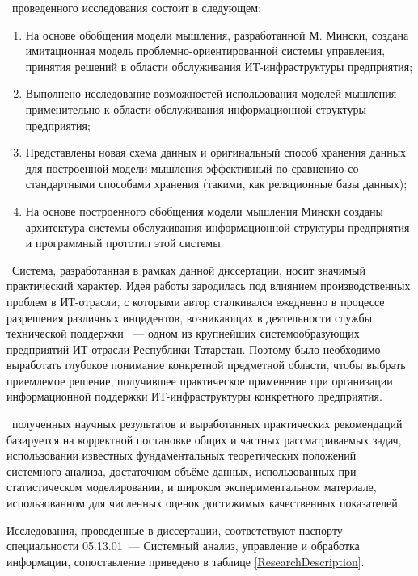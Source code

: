 \novelty\ проведенного исследования состоит в следующем:
\begin{enumerate}
  \item На основе обобщения модели мышления, разработанной М. Мински, создана имитационная модель проблемно-ориентированной системы управления, принятия решений в области обслуживания ИТ-инфраструктуры предприятия;
  \item Выполнено исследование возможностей использования моделей мышления применительно к области обслуживания информационной структуры предприятия;
  \item Представлены новая схема данных и оригинальный способ хранения данных для построенной модели мышления эффективный по сравнению со стандартными способами хранения (такими, как реляционные базы данных);
  \item На основе построенного обобщения модели мышления Мински созданы архитектура системы обслуживания информационной структуры предприятия и программный прототип этой системы.
\end{enumerate}

\influence\ 
Система, разработанная в рамках данной диссертации, носит значимый практический характер. Идея работы зародилась под влиянием производственных проблем в ИТ-отрасли, с которыми автор сталкивался ежедневно в процессе разрешения различных инцидентов, возникающих в деятельности службы технической поддержки \icl~--- одном из крупнейших системообразующих предприятий ИТ-отрасли Республики Татарстан. Поэтому было необходимо выработать глубокое понимание конкретной предметной области, чтобы выбрать приемлемое решение, получившее практическое применение при организации информационной поддержки ИТ-инфраструктуры конкретного предприятия. \par
\reliability\ полученных научных результатов и выработанных практических рекомендаций базируется на корректной постановке общих и частных рассматриваемых задач,  использовании известных фундаментальных теоретических положений системного анализа, достаточном объёме данных, использованных при статистическом моделировании, и широком экспериментальном материале, использованном для численных оценок достижимых качественных показателей. \par 
Исследования, проведенные в диссертации, соответствуют паспорту специальности 05.13.01~--- Системный анализ, управление и обработка информации, сопоставление приведено в таблице \ref{ResearchDescription}.

